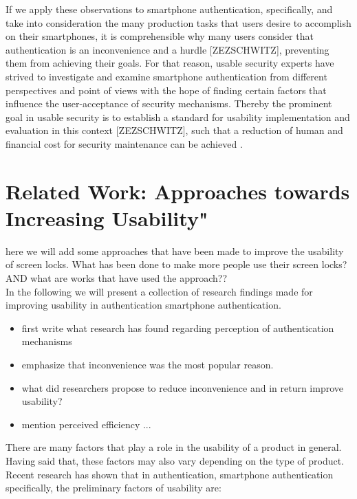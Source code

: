 If we apply these observations to smartphone authentication, specifically, and take into consideration the many production tasks that users desire to accomplish on their smartphones, it is comprehensible why many users consider that authentication is an inconvenience \cite{Egelman:2014:YRL:2660267.2660273, harbach} and a hurdle [ZEZSCHWITZ], preventing them from achieving their goals. For that reason, usable security experts have strived to investigate and examine smartphone authentication from different perspectives and point of views with the hope of finding certain factors that influence the user-acceptance of security mechanisms. Thereby the prominent goal in usable security is to establish a standard for usability implementation and evaluation in this context [ZEZSCHWITZ], such that a reduction of human and financial cost for security maintenance can be achieved \cite{sasse}. 

\section{Related Work: Approaches towards Increasing Usability"}


here we will add some approaches that have been made to improve the usability of screen locks. What has been done to make more people use their screen locks? AND what are works that have used the approach??\\

In the following we will present a collection of research findings made for improving usability in authentication smartphone authentication. 
\begin{itemize}
    \item first write what research has found regarding perception of authentication mechanisms 
    \item emphasize that inconvenience was the most popular reason.
    \item what did researchers propose to reduce inconvenience and in return improve usability? 
    \item mention perceived efficiency ... 

\end{itemize}

There are many factors that play a role in the usability of a product in general. Having said that, these factors may also vary depending on the type of product. Recent research has shown that in authentication, smartphone authentication specifically, the preliminary factors of usability are: 

